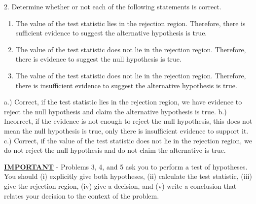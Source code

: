 \documentclass{report}
\begin{document}
\pagebreak \bigbreak \noindent 
\begin{mdframed}
2. Determine whether or not each of the following statements is correct.
\begin{enumerate}[label=(\alph*)]
    \item The value of the test statistic lies in the rejection region. Therefore, there is sufficient evidence to suggest the alternative hypothesis is true.
    \item The value of the test statistic does not lie in the rejection region. Therefore, there is evidence to suggest the null hypothesis is true.
    \item The value of the test statistic does not lie in the rejection region. Therefore, there is insufficient evidence to suggest the alternative hypothesis is true.
\end{enumerate}
\end{mdframed}
\bigbreak \noindent 
a.) Correct, if the test statistic lies in the rejection region, we have evidence to reject the null hypothesis and claim the alternative hypothesis is true.
\bigbreak \noindent 
b.) Incorrect, if the evidence is not enough to reject the null hypothesis, this does not mean the null hypothesis is true, only there is insufficient evidence to support it.
\bigbreak \noindent 
c.) Correct, if the value of the test statistic does not lie in the rejection region, we do not reject the null hypothesis and do not claim the alternative is true.

\pagebreak \bigbreak \noindent 
\textbf{\underline{IMPORTANT}} - Problems 3, 4, and 5 ask you to perform a test of hypotheses. You should (i) explicitly give both hypotheses, (ii) calculate the test statistic, (iii) give the rejection region, (iv) give a decision, and (v) write a conclusion that relates your decision to the context of the problem.
\end{document}
